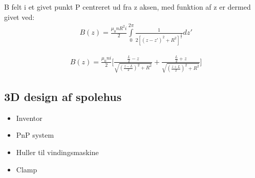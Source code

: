 B felt i et givet punkt P centreret ud fra z aksen, med funktion af z er dermed givet ved:
\begin{align}
	&B(z)=\frac{\mu_0 n R^2 i}{2}\int\limits_{0}^{2\pi}\frac{1}{2[(z-z')^2+R^2]^\frac{3}{2}}dz'
\end{align}

\begin{align}
	&B(z)=\frac{\mu_0 n i}{2}\bigg[\frac{\frac{L}{2}-z}{\sqrt{(\frac{z-L}{2})^2+R^2}}+\frac{\frac{L}{2}+z}{\sqrt{(\frac{z+L}{2})^2+R^2}}\bigg]
\end{align}

\subsection{3D design af spolehus}
\begin{itemize}
	\item Inventor
	\item PnP system
	\item Huller til vindingsmaskine
	\item Clamp
\end{itemize}
